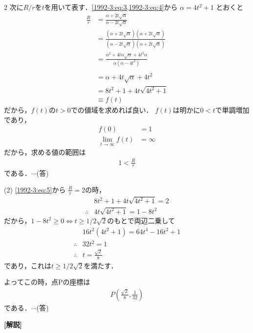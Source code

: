 \documentclass[../../../../main.tex]{subfiles}
\begin{document}
\begin{multicols}{2}
  次に$R/r$を$t$を用いて表す．\cref{1992-3:eq:3,1992-3:eq:4}から
  $\alpha = 4t^2+1$ とおくと
  \begin{align}
    \frac{R}{r}
     & = \frac{\alpha+2t\sqrt{\alpha}}{\alpha-2t\sqrt{\alpha}}                                                                                                 \\
     & = \frac{\left(\alpha+2t\sqrt{\alpha}\right)\left(\alpha+2t\sqrt{\alpha}\right)}{\left(\alpha-2t\sqrt{\alpha}\right)\left(\alpha+2t\sqrt{\alpha}\right)} \\
     & = \frac{\alpha^2+4t\alpha\sqrt{\alpha}+4t^2\alpha}{\alpha(\alpha-4t^2)}                                                                                 \\                                                                                                 \\
     & = \alpha +4t\sqrt{\alpha} + 4t^2                                                                                                                        \\
     & = 8t^2+1+4t\sqrt{4t^2+1}                                                                                                                                \\
     & \equiv f(t) \label{1992-3:eq:5}
  \end{align}
  だから，$f(t)$の$t>0$での値域を求めれば良い．
  $f(t)$は明かに$0<t$で単調増加であり，
  \begin{align*}
    f(0)                  & = 1      \\
    \lim_{t\to\infty}f(t) & = \infty
  \end{align*}
  だから，求める値の範囲は
  \begin{align*}
    1 < \frac{R}{r}
  \end{align*}
  である．$\cdots$(答)
  \vspace{10pt}

  (2)
  \cref{1992-3:eq:5}から $\frac{R}{r}=2$の時，
  \begin{align*}
     & 8t^2+1+4t\sqrt{4t^2+1} = 2 \\
    \therefore
     & 4t\sqrt{4t^2+1} = 1-8t^2
  \end{align*}
  だから，$1-8t^2\ge0 \iff t\ge 1/2\sqrt{2}$のもとで両辺二乗して
  \begin{align*}
     & 16t^2(4t^2+1) = 64t^4-16t^2+1 \\
    \therefore
     & 32t^2 = 1                     \\
    \therefore
     & t = \frac{\sqrt{2}}{8}
  \end{align*}
  であり，これは$t\ge 1/2\sqrt{2}$を満たす．

  よってこの時，点Pの座標は
  \begin{align*}
    P\left(\frac{\sqrt{2}}{8}, \frac{1}{32}\right)
  \end{align*}
  である．$\cdots$(答)
  \vspace{10pt}

  {\bf[解説]}


  \newpage
\end{multicols}
\end{document}
